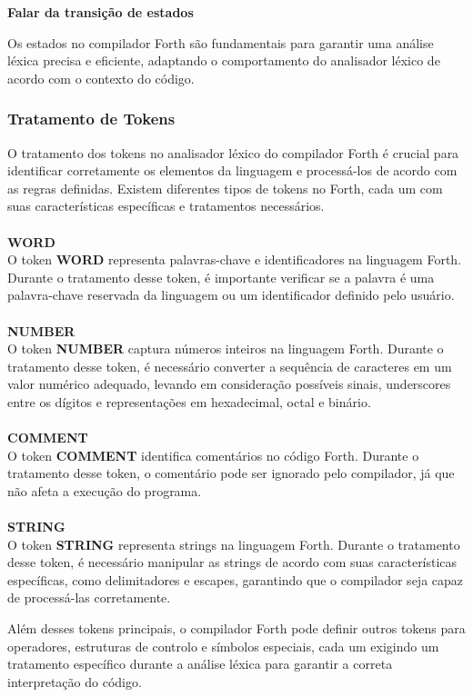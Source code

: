 \documentclass{predef}
\begin{document}
\textbf{Falar da transição de estados}

Os estados no compilador Forth são fundamentais para garantir uma análise léxica precisa e eficiente, adaptando o comportamento do analisador léxico de acordo com o contexto do código.



\subsubsection{Tratamento de Tokens}

O tratamento dos tokens no analisador léxico do compilador Forth é crucial para identificar corretamente os elementos da linguagem e processá-los de acordo com as regras definidas. Existem diferentes tipos de tokens no Forth, cada um com suas características específicas e tratamentos necessários.
\\\\
\textbf{WORD} \\
O token \textbf{WORD} representa palavras-chave e identificadores na linguagem Forth. Durante o tratamento desse token, é importante verificar se a palavra é uma palavra-chave reservada da linguagem ou um identificador definido pelo usuário.
\\\\
\textbf{NUMBER} \\
O token \textbf{NUMBER} captura números inteiros na linguagem Forth. Durante o tratamento desse token, é necessário converter a sequência de caracteres em um valor numérico adequado, levando em consideração possíveis sinais, underscores entre os dígitos e representações em hexadecimal, octal e binário.
\\\\
\textbf{COMMENT} \\
O token \textbf{COMMENT} identifica comentários no código Forth. Durante o tratamento desse token, o comentário pode ser ignorado pelo compilador, já que não afeta a execução do programa.
\\\\
\textbf{STRING} \\
O token \textbf{STRING} representa strings na linguagem Forth. Durante o tratamento desse token, é necessário manipular as strings de acordo com suas características específicas, como delimitadores e escapes, garantindo que o compilador seja capaz de processá-las corretamente.

Além desses tokens principais, o compilador Forth pode definir outros tokens para operadores, estruturas de controlo e símbolos especiais, cada um exigindo um tratamento específico durante a análise léxica para garantir a correta interpretação do código.
\end{document}
